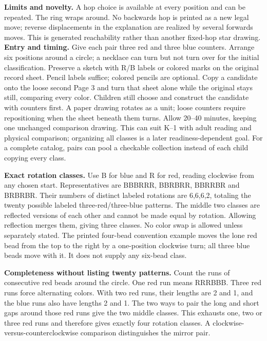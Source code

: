 \textbf{Limits and novelty.} A hop choice is available at every position and can be repeated. The ring wraps around. No backwards hop is printed as a new legal move; reverse displacements in the explanation are realized by several forwards moves. This is generated reachability rather than another fixed-hop star drawing.
\newpage
{}
\textbf{Entry and timing.} Give each pair three red and three blue counters. Arrange six positions around a circle; a necklace can turn but not turn over for the initial classification. Preserve a sketch with R/B labels or colored marks on the original record sheet. Pencil labels suffice; colored pencils are optional. Copy a candidate onto the loose second Page 3 and turn that sheet alone while the original stays still, comparing every color. Children still choose and construct the candidate with counters first. A paper drawing rotates as a unit; loose counters require repositioning when the sheet beneath them turns. Allow 20--40 minutes, keeping one unchanged comparison drawing. This can suit K--1 with adult reading and physical comparison; organizing all classes is a later readiness-dependent goal. For a complete catalog, pairs can pool a checkable collection instead of each child copying every class.

\textbf{Exact rotation classes.} Use B for blue and R for red, reading clockwise from any chosen start. Representatives are BBBRRR, BBRBRR, BBRRBR and BRBRBR. Their numbers of distinct labeled rotations are 6,6,6,2, totaling the twenty possible labeled three-red/three-blue patterns. The middle two classes are reflected versions of each other and cannot be made equal by rotation. Allowing reflection merges them, giving three classes. No color swap is allowed unless separately stated. The printed four-bead convention example moves the lone red bead from the top to the right by a one-position clockwise turn; all three blue beads move with it. It does not supply any six-bead class.

\textbf{Completeness without listing twenty patterns.} Count the runs of consecutive red beads around the circle. One red run means RRRBBB. Three red runs force alternating colors. With two red runs, their lengths are 2 and 1, and the blue runs also have lengths 2 and 1. The two ways to pair the long and short gaps around those red runs give the two middle classes. This exhausts one, two or three red runs and therefore gives exactly four rotation classes. A clockwise-versus-counterclockwise comparison distinguishes the mirror pair.

